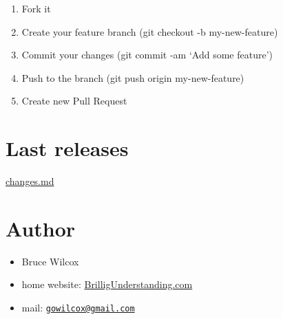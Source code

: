\documentclass[]{article}
\providecommand{\tightlist}{%
  \setlength{\itemsep}{0pt}\setlength{\parskip}{0pt}}
\begin{document}
\begin{enumerate}
\def\labelenumi{\arabic{enumi}.}
\tightlist
\item
  Fork it
\item
  Create your feature branch (git checkout -b my-new-feature)
\item
  Commit your changes (git commit -am `Add some feature')
\item
  Push to the branch (git push origin my-new-feature)
\item
  Create new Pull Request
\end{enumerate}

\section{Last releases}\label{last-releases}

\href{/changes.md}{changes.md}

\section{Author}\label{author}

\begin{itemize}
\tightlist
\item
  Bruce Wilcox
\item
  home website:
  \href{http://www.brilligunderstanding.com}{BrilligUnderstanding.com}
\item
  mail: \href{mailto:gowilcox@gmail.com}{\nolinkurl{gowilcox@gmail.com}}
\end{itemize}
\end{document}
